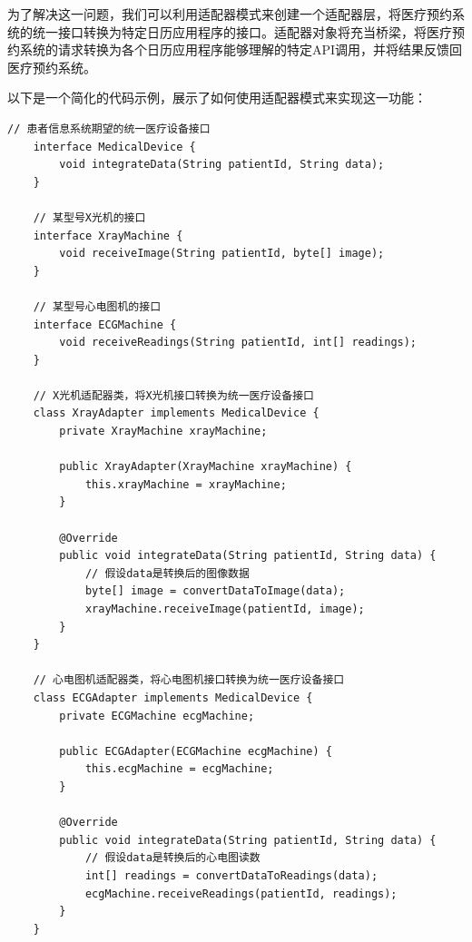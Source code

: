 为了解决这一问题，我们可以利用适配器模式来创建一个适配器层，将医疗预约系统的统一接口转换为特定日历应用程序的接口。适配器对象将充当桥梁，将医疗预约系统的请求转换为各个日历应用程序能够理解的特定API调用，并将结果反馈回医疗预约系统。

以下是一个简化的代码示例，展示了如何使用适配器模式来实现这一功能：



\lstset{style=mystyle}

\begin{lstlisting}[caption={医疗预约系统期望的统一事件提醒接口}]
	// 患者信息系统期望的统一医疗设备接口
	interface MedicalDevice {
		void integrateData(String patientId, String data);
	}
	
	// 某型号X光机的接口
	interface XrayMachine {
		void receiveImage(String patientId, byte[] image);
	}
	
	// 某型号心电图机的接口
	interface ECGMachine {
		void receiveReadings(String patientId, int[] readings);
	}
	
	// X光机适配器类，将X光机接口转换为统一医疗设备接口
	class XrayAdapter implements MedicalDevice {
		private XrayMachine xrayMachine;
		
		public XrayAdapter(XrayMachine xrayMachine) {
			this.xrayMachine = xrayMachine;
		}
		
		@Override
		public void integrateData(String patientId, String data) {
			// 假设data是转换后的图像数据
			byte[] image = convertDataToImage(data);
			xrayMachine.receiveImage(patientId, image);
		}
	}
	
	// 心电图机适配器类，将心电图机接口转换为统一医疗设备接口
	class ECGAdapter implements MedicalDevice {
		private ECGMachine ecgMachine;
		
		public ECGAdapter(ECGMachine ecgMachine) {
			this.ecgMachine = ecgMachine;
		}
		
		@Override
		public void integrateData(String patientId, String data) {
			// 假设data是转换后的心电图读数
			int[] readings = convertDataToReadings(data);
			ecgMachine.receiveReadings(patientId, readings);
		}
	}
\end{lstlisting}

